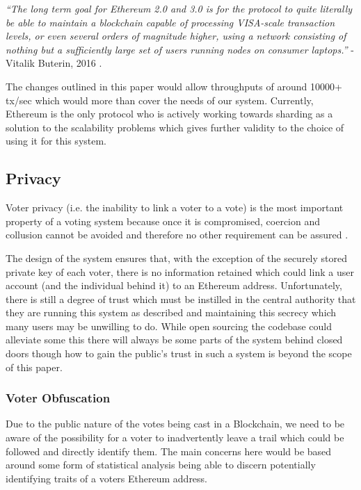 \documentclass{article}
\begin{document}
	\textit{``The long term goal for Ethereum 2.0 and 3.0 is for the protocol to quite literally be able to maintain a blockchain capable of processing VISA-scale transaction levels, or even several orders of magnitude higher, using a network consisting of nothing but a sufficiently large set of users running nodes on consumer laptops.''} - Vitalik Buterin, 2016 \citep{74_ethereum_announces_unlimited_scalability_roadmap}.
	
	The changes outlined in this paper would allow throughputs of around 10000+ tx/sec \citep{75_eip_105} which would more than cover the needs of our system. Currently, Ethereum is the only protocol who is actively working towards sharding as a solution to the scalability problems which gives further validity to the choice of using it for this system.
	
	\clearpage
	\subsection{Privacy}
	Voter privacy (i.e. the inability to link a voter to a vote) is the most important property of a voting system because once it is compromised, coercion and collusion cannot be avoided and therefore no other requirement can be assured \citep{48_safevote_2001}. 
	
	The design of the system ensures that, with the exception of the securely stored private key of each voter, there is no information retained which could link a user account (and the individual behind it) to an Ethereum address. Unfortunately, there is still a degree of trust which must be instilled in the central authority that they are running this system as described and maintaining this secrecy which many users may be unwilling to do. While open sourcing the codebase could alleviate some this there will always be some parts of the system behind closed doors though how to gain the public's trust in such a system is beyond the scope of this paper.
	
	\subsubsection{Voter Obfuscation}
	Due to the public nature of the votes being cast in a Blockchain, we need to be aware of the possibility for a voter to inadvertently leave a trail which could be followed and directly identify them. The main concerns here would be based around some form of statistical analysis being able to discern potentially identifying traits of a voters Ethereum address. 
	
\end{document}
